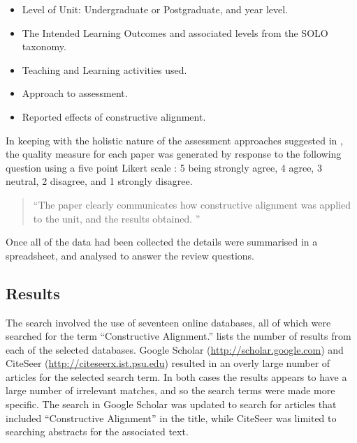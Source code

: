 \begin{itemize}[noitemsep,nolistsep]
	\item Level of Unit: Undergraduate or Postgraduate, and year level.
	\item The Intended Learning Outcomes and associated levels from the SOLO taxonomy.
	\item Teaching and Learning activities used.
	\item Approach to assessment.
	\item Reported effects of constructive alignment.
\end{itemize}

In keeping with the holistic nature of the assessment approaches suggested in \cite{Biggs:1997}, the quality measure for each paper was generated by response to the following question using a five point Likert scale \cite{Likert:1932}: 5 being strongly agree, 4 agree, 3 neutral, 2 disagree, and 1 strongly disagree.

\begin{quote}
``The paper clearly communicates how constructive alignment was applied to the unit, and the results obtained. ''	
\end{quote}

Once all of the data had been collected the details were summarised in a spreadsheet, and analysed to answer the review questions.



\clearpage
\subsection{Results} %
\label{sub:review_results}

The search involved the use of seventeen online databases, all of which were searched for the term ``Constructive Alignment.''  lists the number of results from each of the selected databases. Google Scholar (\url{http://scholar.google.com}) and CiteSeer (\url{http://citeseerx.ist.psu.edu}) resulted in an overly large number of articles for the selected search term. In both cases the results appears to have a large number of irrelevant matches, and so the search terms were made more specific. The search in Google Scholar was updated to search for articles that included ``Constructive Alignment'' in the title, while CiteSeer was limited to searching abstracts for the associated text.

